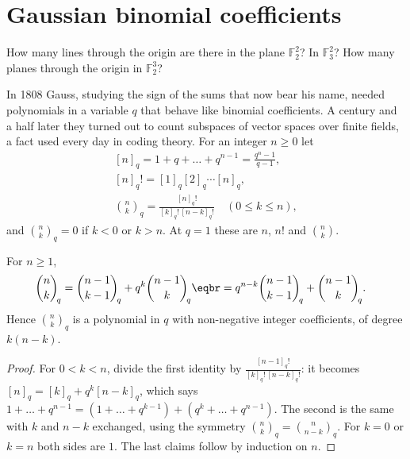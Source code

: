 \section{Gaussian binomial coefficients}

\begin{think}
How many lines through the origin are there in the plane $\mathbb F_2^2$? In $\mathbb F_3^2$? How many planes through the origin in $\mathbb F_2^3$?
\end{think}

In 1808 Gauss, studying the sign of the sums that now bear his name, needed polynomials in a variable $q$ that behave like binomial
coefficients. A century and a half later they turned out to count subspaces of vector spaces over finite fields, a fact used
every day in coding theory. For an integer $n\ge0$ let
\[
\begin{gathered}[n]_q=1+q+\dots+q^{n-1}=\frac{q^n-1}{q-1},\\{}[n]_q!=[1]_q[2]_q\cdots[n]_q,\\ \binom nk_{\!q}=\frac{[n]_q!}{[k]_q!\,[n-k]_q!}\quad(0\le k\le n),\end{gathered}
\]
and $\binom nk_q=0$ if $k<0$ or $k>n$. At $q=1$ these are $n$, $n!$ and $\binom nk$.

\begin{proposition}[$q$-Pascal]\label{prop:qpascal}
For $n\ge1$,
\[
\begin{aligned}{}&\binom nk_{\!q}=\binom{n-1}{k-1}_{\!q}+q^k\binom{n-1}k_{\!q}\eqbr=q^{n-k}\binom{n-1}{k-1}_{\!q}+\binom{n-1}k_{\!q}.\end{aligned}
\]
Hence $\binom nk_q$ is a polynomial in $q$ with non-negative integer coefficients, of degree $k(n-k)$.
\end{proposition}
\begin{proof}
For $0<k<n$, divide the first identity by $\frac{[n-1]_q!}{[k]_q!\,[n-k]_q!}$: it becomes $[n]_q=[k]_q+q^k[n-k]_q$, which says $1+\dots+q^{n-1}=(1+\dots+q^{k-1})+(q^k+\dots+q^{n-1})$.
The second is the same with $k$ and $n-k$ exchanged, using the symmetry $\binom nk_q=\binom n{n-k}_q$. For $k=0$ or $k=n$ both sides are $1$. The
last claims follow by induction on $n$.
\end{proof}

